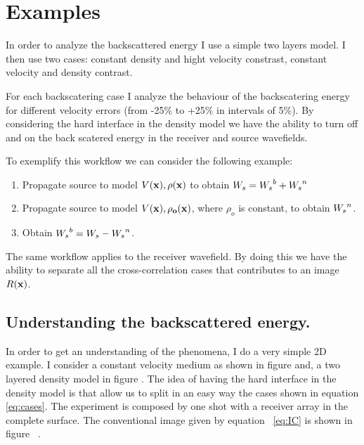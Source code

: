 \section{Examples}
In order to analyze the backscattered energy I use a simple two layers model. I then 
use two cases: constant density and hight  velocity constrast, constant velocity and density
contrast.  

For each backscatering case I analyze the behaviour of the backscatering energy for different
velocity errors (from -25\% to +25\% in intervals of 5\%). By considering the hard interface in 
the density model we have the ability to turn off and on the back scatered energy in the receiver
 and source wavefields.

To exemplify this workflow we can consider the following example:
\begin{enumerate}
\item Propagate source to model $V(\bf{x}), \rho(\bf{x})$ to obtain ${W_s}={W_s}^b +{W_s}^n$
\item Propagate source to model $V(\bf{x}), \rho_o(\bf{x})$, where
$\rho_o$ is constant, to obtain ${W_s}^n$.
\item Obtain ${W_s}^b= {W_s} -{W_s}^n$.
\end{enumerate}

The same workflow applies to the receiver wavefield. By doing this we have the ability to separate all 
the cross-correlation cases that contributes to an image $R(\bf{x})$.

\subsection{Understanding the backscattered energy.}

In order to get an understanding of the phenomena, I do a very simple 2D example. I consider
a constant velocity medium as shown in figure  and, a two layered density model in figure . The idea of having the 
hard interface in the density model is that allow us to split in an easy way the cases shown in equation \ref{eq:cases}. 
The experiment is composed by one shot with a receiver array in the complete surface. The conventional image
given by equation ~\ref{eq:IC} is shown in figure ~.






